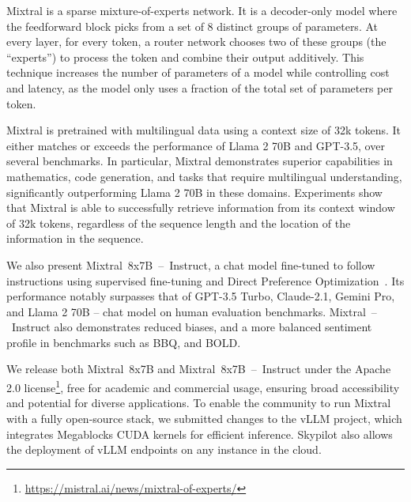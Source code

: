 \documentclass{article}
\def\llama{Llama\xspace}
\def\mixtral{Mixtral\xspace}
\def\mixtralEXSB{Mixtral~8x7B\xspace}
\def\mixtralchat{Mixtral~--~Instruct\xspace}
\def\mixtralEXSBchat{Mixtral~8x7B~--~Instruct\xspace}
\begin{document}
\mixtral is a sparse mixture-of-experts network. It is a decoder-only model where the feedforward block picks from a set of 8 distinct groups of parameters. At every layer, for every token, a router network chooses two of these groups (the “experts”) to process the token and combine their output additively. This technique increases the number of parameters of a model while controlling cost and latency, as the model only uses a fraction of the total set of parameters per token.

\mixtral is pretrained with multilingual data using a context size of 32k tokens. It either matches or exceeds the performance of \llama 2 70B and GPT-3.5, over several benchmarks. In particular, \mixtral demonstrates superior capabilities in mathematics, code generation, and tasks that require multilingual understanding, significantly outperforming \llama 2 70B in these domains. Experiments show that \mixtral is able to successfully retrieve information from its context window of 32k tokens, regardless of the sequence length and the location of the information in the sequence.

We also present \mixtralEXSBchat, a chat model fine-tuned to follow instructions using supervised fine-tuning and Direct Preference Optimization~\cite{rafailov2023direct}. Its performance notably surpasses that of GPT-3.5 Turbo, Claude-2.1, Gemini Pro, and \llama 2 70B – chat model on human evaluation benchmarks.
\mixtralchat also demonstrates reduced biases, and a more balanced sentiment profile in benchmarks such as BBQ, and BOLD.

We release both \mixtralEXSB and \mixtralEXSBchat under the Apache 2.0 license\footnote{\url{https://mistral.ai/news/mixtral-of-experts/}}, free for academic and commercial usage, ensuring broad accessibility and potential for diverse applications. 
To enable the community to run \mixtral with a fully open-source stack, we submitted changes to the vLLM project, which integrates Megablocks CUDA kernels for efficient inference.
Skypilot also allows the deployment of vLLM endpoints on any instance in the cloud. 
\end{document}
